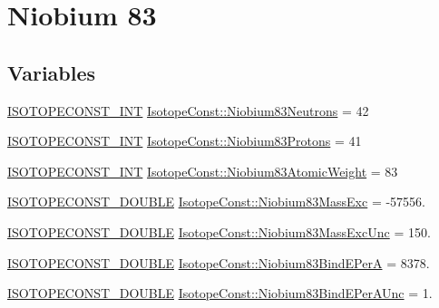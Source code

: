 \hypertarget{group___isotope_const-_niobium-_nb83}{}\section{Niobium 83}
\label{group___isotope_const-_niobium-_nb83}
\subsection*{Variables}
\begin{DoxyCompactItemize}
\item 
\mbox{\hyperlink{group___isotope_const-_macros_ga5f18360b3e99483a35c32d789e62621c}{I\+S\+O\+T\+O\+P\+E\+C\+O\+N\+S\+T\+\_\+\+I\+NT}} \mbox{\hyperlink{group___isotope_const-_niobium-_nb83_ga41f71b699997762d50b08ca9a2978941}{Isotope\+Const\+::\+Niobium83\+Neutrons}} = 42
\item 
\mbox{\hyperlink{group___isotope_const-_macros_ga5f18360b3e99483a35c32d789e62621c}{I\+S\+O\+T\+O\+P\+E\+C\+O\+N\+S\+T\+\_\+\+I\+NT}} \mbox{\hyperlink{group___isotope_const-_niobium-_nb83_gaefab291a19617733c5c9d0b7cd0625c8}{Isotope\+Const\+::\+Niobium83\+Protons}} = 41
\item 
\mbox{\hyperlink{group___isotope_const-_macros_ga5f18360b3e99483a35c32d789e62621c}{I\+S\+O\+T\+O\+P\+E\+C\+O\+N\+S\+T\+\_\+\+I\+NT}} \mbox{\hyperlink{group___isotope_const-_niobium-_nb83_gaff190c66982fa4e4eca3247688f96d16}{Isotope\+Const\+::\+Niobium83\+Atomic\+Weight}} = 83
\item 
\mbox{\hyperlink{group___isotope_const-_macros_ga8f45a7272ce02c0b4c65c44636ed719a}{I\+S\+O\+T\+O\+P\+E\+C\+O\+N\+S\+T\+\_\+\+D\+O\+U\+B\+LE}} \mbox{\hyperlink{group___isotope_const-_niobium-_nb83_ga6de0b7dfcbdbaccf9eb55522757f1332}{Isotope\+Const\+::\+Niobium83\+Mass\+Exc}} = -\/57556.
\item 
\mbox{\hyperlink{group___isotope_const-_macros_ga8f45a7272ce02c0b4c65c44636ed719a}{I\+S\+O\+T\+O\+P\+E\+C\+O\+N\+S\+T\+\_\+\+D\+O\+U\+B\+LE}} \mbox{\hyperlink{group___isotope_const-_niobium-_nb83_gabda7f108713d8cec57a9faac254916d7}{Isotope\+Const\+::\+Niobium83\+Mass\+Exc\+Unc}} = 150.
\item 
\mbox{\hyperlink{group___isotope_const-_macros_ga8f45a7272ce02c0b4c65c44636ed719a}{I\+S\+O\+T\+O\+P\+E\+C\+O\+N\+S\+T\+\_\+\+D\+O\+U\+B\+LE}} \mbox{\hyperlink{group___isotope_const-_niobium-_nb83_ga53d8012606f99c8923ab74b75d9824e6}{Isotope\+Const\+::\+Niobium83\+Bind\+E\+PerA}} = 8378.
\item 
\mbox{\hyperlink{group___isotope_const-_macros_ga8f45a7272ce02c0b4c65c44636ed719a}{I\+S\+O\+T\+O\+P\+E\+C\+O\+N\+S\+T\+\_\+\+D\+O\+U\+B\+LE}} \mbox{\hyperlink{group___isotope_const-_niobium-_nb83_ga27adbc0abfb6652fbc4d95bdec20e2ab}{Isotope\+Const\+::\+Niobium83\+Bind\+E\+Per\+A\+Unc}} = 1.

\end{DoxyCompactItemize}
